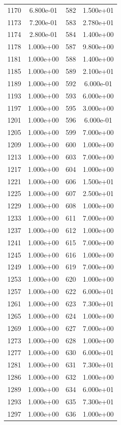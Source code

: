 \documentclass[12pt]{article}
\begin{document}
\begin{longtable}{@{}cccc@{}}
1170 & 6.800e-01 & 582 & 1.500e+01 \\
1173 & 7.200e-01 & 583 & 2.780e+01 \\
1174 & 2.800e-01 & 584 & 1.400e+00 \\
1178 & 1.000e+00 & 587 & 9.800e+00 \\
1181 & 1.000e+00 & 588 & 1.400e+00 \\
1185 & 1.000e+00 & 589 & 2.100e+01 \\
1189 & 1.000e+00 & 592 & 6.000e-01 \\
1193 & 1.000e+00 & 593 & 6.000e+00 \\
1197 & 1.000e+00 & 595 & 3.000e+00 \\
1201 & 1.000e+00 & 596 & 6.000e-01 \\
1205 & 1.000e+00 & 599 & 7.000e+00 \\
1209 & 1.000e+00 & 600 & 1.000e+00 \\
1213 & 1.000e+00 & 603 & 7.000e+00 \\
1217 & 1.000e+00 & 604 & 1.000e+00 \\
1221 & 1.000e+00 & 606 & 1.500e+01 \\
1225 & 1.000e+00 & 607 & 2.500e+01 \\
1229 & 1.000e+00 & 608 & 1.000e+00 \\
1233 & 1.000e+00 & 611 & 7.000e+00 \\
1237 & 1.000e+00 & 612 & 1.000e+00 \\
1241 & 1.000e+00 & 615 & 7.000e+00 \\
1245 & 1.000e+00 & 616 & 1.000e+00 \\
1249 & 1.000e+00 & 619 & 7.000e+00 \\
1253 & 1.000e+00 & 620 & 1.000e+00 \\
1257 & 1.000e+00 & 622 & 6.000e+01 \\
1261 & 1.000e+00 & 623 & 7.300e+01 \\
1265 & 1.000e+00 & 624 & 1.000e+00 \\
1269 & 1.000e+00 & 627 & 7.000e+00 \\
1273 & 1.000e+00 & 628 & 1.000e+00 \\
1277 & 1.000e+00 & 630 & 6.000e+01 \\
1281 & 1.000e+00 & 631 & 7.300e+01 \\
1286 & 1.000e+00 & 632 & 1.000e+00 \\
1289 & 1.000e+00 & 634 & 6.000e+01 \\
1293 & 1.000e+00 & 635 & 7.300e+01 \\
1297 & 1.000e+00 & 636 & 1.000e+00 \\

\end{longtable}
\end{document}
